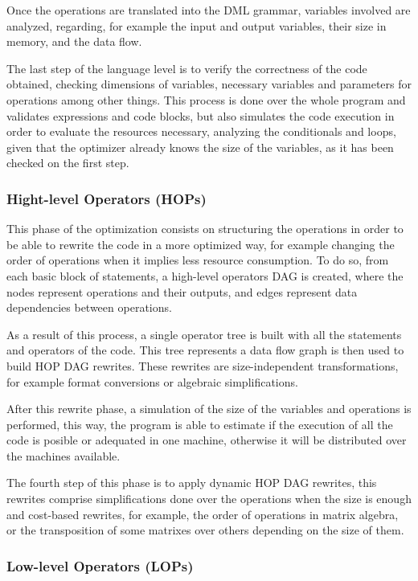 \documentclass[11pt]{article} %
\begin{document}
        Once the operations are translated into the DML grammar, variables involved are analyzed, regarding, for example the input and output variables, their size in memory, and the data flow.

        The last step of the language level is to verify the correctness of the code obtained, checking dimensions of variables, necessary variables and parameters for operations among other things. This process is done over the whole program and validates expressions and code blocks, but also simulates the code execution in order to evaluate the resources necessary, analyzing the conditionals and loops, given that the optimizer already knows the size of the variables, as it has been checked on the first step.

      \subsubsection*{Hight-level Operators (HOPs)}

        This phase of the optimization consists on structuring the operations in order to be able to rewrite the code in a more optimized way, for example changing the order of operations when it implies less resource consumption. To do so, from each basic block of statements, a high-level operators DAG is created, where the nodes represent operations and their outputs, and edges represent data dependencies between operations.

        As a result of this process, a single operator tree is built with all the statements and operators of the code. This tree represents a data flow graph is then used to build HOP DAG rewrites. These rewrites are size-independent transformations, for example format conversions or algebraic simplifications.

        After this rewrite phase, a simulation of the size of the variables and operations is performed, this way, the program is able to estimate if the execution of all the code is posible or adequated in one machine, otherwise it will be distributed over the machines available.

        The fourth step of this phase is to apply dynamic HOP DAG rewrites, this rewrites comprise simplifications done over the operations when the size is enough and cost-based rewrites, for example, the order of operations in matrix algebra, or the transposition of some matrixes over others depending on the size of them.

      \subsubsection*{Low-level Operators (LOPs)}
\end{document}
